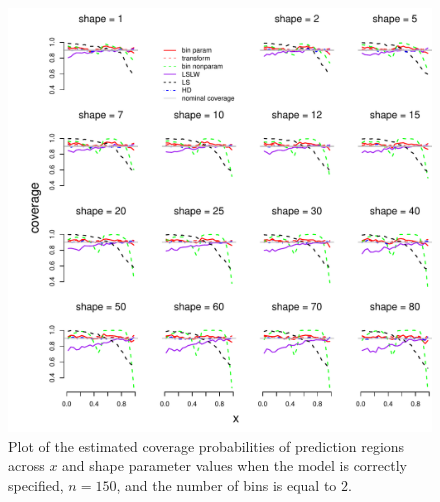 \documentclass[11pt]{article}\usepackage[]{graphicx}\usepackage[]{color}
\makeatletter
\def\maxwidth{ %
  \ifdim\Gin@nat@width>\linewidth
    \linewidth
  \else
    \Gin@nat@width
  \fi
}
\newenvironment{knitrout}{}{} %
\makeatother
\begin{document}
\newpage
\begin{figure}[h!]
\begin{center}
\begin{knitrout}
\color{fgcolor}
\includegraphics[width=\maxwidth]{figure/Fig-gamma-inx-150-1} 

\end{knitrout}
\end{center}
\caption{Plot of the estimated coverage probabilities of prediction regions 
  across $x$ and shape parameter values when the model is correctly 
  specified, $n = 150$, and the number of bins is equal to $2$.}
\label{Fig:gamma.inx.150}
\end{figure}
\end{document}
